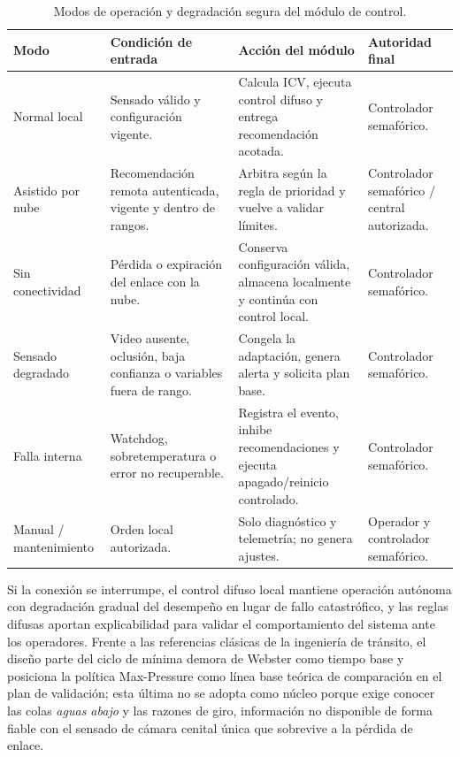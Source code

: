 \begin{table}[H]
  \centering
  \caption{Modos de operación y degradación segura del módulo de control.}
  \label{tab:modos-operacion}
  \begin{tabular}{@{}p{2.4cm}p{3.6cm}p{4.0cm}p{3.2cm}@{}}
    \toprule
    \textbf{Modo} & \textbf{Condición de entrada} & \textbf{Acción del módulo} & \textbf{Autoridad final}\\
    \midrule
    Normal local & Sensado válido y configuración vigente. & Calcula ICV, ejecuta control difuso y entrega recomendación acotada. & Controlador semafórico.\\
    Asistido por nube & Recomendación remota autenticada, vigente y dentro de rangos. & Arbitra según la regla de prioridad y vuelve a validar límites. & Controlador semafórico / central autorizada.\\
    Sin conectividad & Pérdida o expiración del enlace con la nube. & Conserva configuración válida, almacena localmente y continúa con control local. & Controlador semafórico.\\
    Sensado degradado & Video ausente, oclusión, baja confianza o variables fuera de rango. & Congela la adaptación, genera alerta y solicita plan base. & Controlador semafórico.\\
    Falla interna & Watchdog, sobretemperatura o error no recuperable. & Registra el evento, inhibe recomendaciones y ejecuta apagado/reinicio controlado. & Controlador semafórico.\\
    Manual / mantenimiento & Orden local autorizada. & Solo diagnóstico y telemetría; no genera ajustes. & Operador y controlador semafórico.\\
    \bottomrule
  \end{tabular}
\end{table}

Si la conexión se interrumpe, el control difuso local mantiene operación autónoma con
degradación gradual del desempeño en lugar de fallo catastrófico, y las reglas difusas aportan
explicabilidad para validar el comportamiento del sistema ante los operadores. Frente a las
referencias clásicas de la ingeniería de tránsito, el diseño parte del ciclo de mínima demora
de Webster como tiempo base y posiciona la política Max-Pressure como línea base teórica de
comparación en el plan de validación; esta última no se adopta como núcleo porque exige conocer
las colas \emph{aguas abajo} y las razones de giro, información no disponible de forma fiable
con el sensado de cámara cenital única que sobrevive a la pérdida de enlace.

